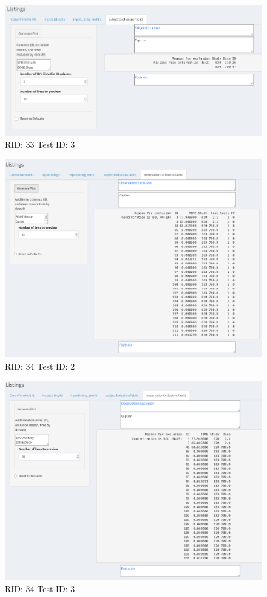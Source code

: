 \begin{figure}[H]
\includegraphics[width=.8\textwidth]{screencaps/33-3-1.png}
\caption{RID: 33 Test ID: 3}
\end{figure}
\begin{figure}[H]
\includegraphics[width=.8\textwidth]{screencaps/34-2-1.png}
\caption{RID: 34 Test ID: 2}
\end{figure}
\begin{figure}[H]
\includegraphics[width=.8\textwidth]{screencaps/34-3-1.png}
\caption{RID: 34 Test ID: 3}
\end{figure}
